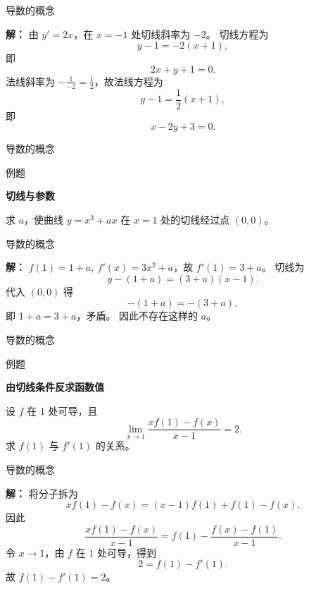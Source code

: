 \documentclass[aspectratio=169,10pt,fontset=fandol]{ctexbeamer}
\newenvironment{warning}{\par\noindent\textbf{注：}\quad}{\par\vspace{0.8em}}
\begin{document}
\begin{frame}[t,fragile]{导数的概念}
\footnotesize
{\footnotesize
\textbf{解：}
由 $y'=2x$，在 $x=-1$ 处切线斜率为 $-2$。 切线方程为
\[
y-1=-2(x+1),
\]
即
\[
2x+y+1=0.
\]
法线斜率为 $-\frac1{-2}=\frac12$，故法线方程为
\[
y-1=\frac12(x+1),
\]
即
\[
x-2y+3=0.
\]

}
\end{frame}
\begin{frame}[t,fragile]{导数的概念}
\footnotesize
\begin{block}{例题}
{\footnotesize
\textbf{切线与参数}\par

求 $a$，使曲线 $y=x^3+ax$ 在 $x=1$ 处的切线经过点 $(0,0)$。

}
\end{block}
\end{frame}
\begin{frame}[t,fragile]{导数的概念}
\footnotesize
{\footnotesize
\textbf{解：}
$f(1)=1+a,\ f'(x)=3x^2+a$，故 $f'(1)=3+a$。 切线为
\[
y-(1+a)=(3+a)(x-1).
\]
代入 $(0,0)$ 得
\[
-(1+a)=-(3+a),
\]
即 $1+a=3+a$，矛盾。 因此不存在这样的 $a$。

}
\end{frame}
\begin{frame}[t,fragile]{导数的概念}
\footnotesize
\begin{block}{例题}
{\footnotesize
\textbf{由切线条件反求函数值}\par

设 $f$ 在 $1$ 处可导，且
\[
\lim_{x\to1}\frac{xf(1)-f(x)}{x-1}=2.
\]
求 $f(1)$ 与 $f'(1)$ 的关系。

}
\end{block}
\end{frame}
\begin{frame}[t,fragile]{导数的概念}
\footnotesize
{\footnotesize
\textbf{解：}
将分子拆为
\[
xf(1)-f(x)=(x-1)f(1)+f(1)-f(x).
\]
因此
\[
\frac{xf(1)-f(x)}{x-1}
=f(1)-\frac{f(x)-f(1)}{x-1}.
\]
令 $x\to1$，由 $f$ 在 $1$ 处可导，得到
\[
2=f(1)-f'(1).
\]
故 $f(1)-f'(1)=2$。

}
\end{frame}
\end{document}
